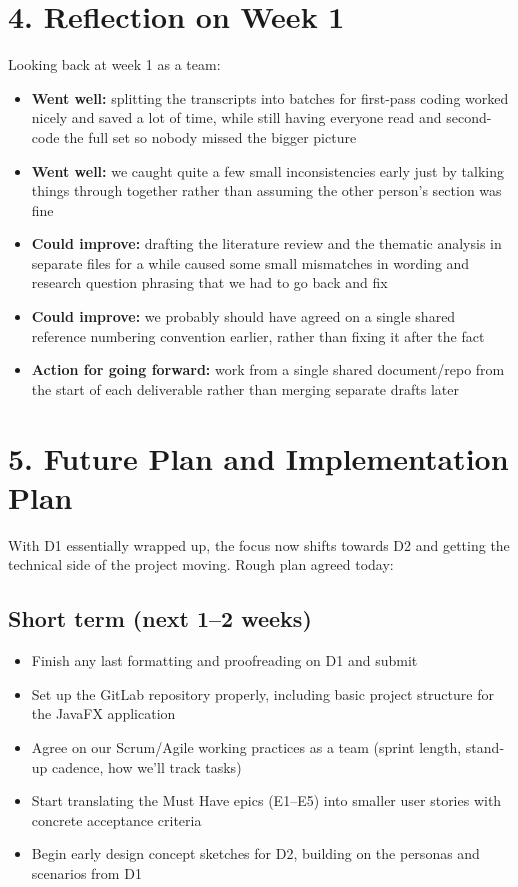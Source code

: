 \documentclass[11pt,a4paper]{article}
\begin{document}
\vspace{10pt}
\section*{4. Reflection on Week 1}

Looking back at week 1 as a team:

\begin{itemize}
    \item \textbf{Went well:} splitting the transcripts into batches for first-pass coding worked nicely and saved a lot of time, while still having everyone read and second-code the full set so nobody missed the bigger picture
    \item \textbf{Went well:} we caught quite a few small inconsistencies early just by talking things through together rather than assuming the other person's section was fine
    \item \textbf{Could improve:} drafting the literature review and the thematic analysis in separate files for a while caused some small mismatches in wording and research question phrasing that we had to go back and fix
    \item \textbf{Could improve:} we probably should have agreed on a single shared reference numbering convention earlier, rather than fixing it after the fact
    \item \textbf{Action for going forward:} work from a single shared document/repo from the start of each deliverable rather than merging separate drafts later
\end{itemize}

\vspace{10pt}
\section*{5. Future Plan and Implementation Plan}

With D1 essentially wrapped up, the focus now shifts towards D2 and getting the technical side of the project moving. Rough plan agreed today:

\subsection*{Short term (next 1--2 weeks)}
\begin{itemize}
    \item Finish any last formatting and proofreading on D1 and submit
    \item Set up the GitLab repository properly, including basic project structure for the JavaFX application
    \item Agree on our Scrum/Agile working practices as a team (sprint length, stand-up cadence, how we'll track tasks)
    \item Start translating the Must Have epics (E1--E5) into smaller user stories with concrete acceptance criteria
    \item Begin early design concept sketches for D2, building on the personas and scenarios from D1
\end{itemize}
\end{document}
